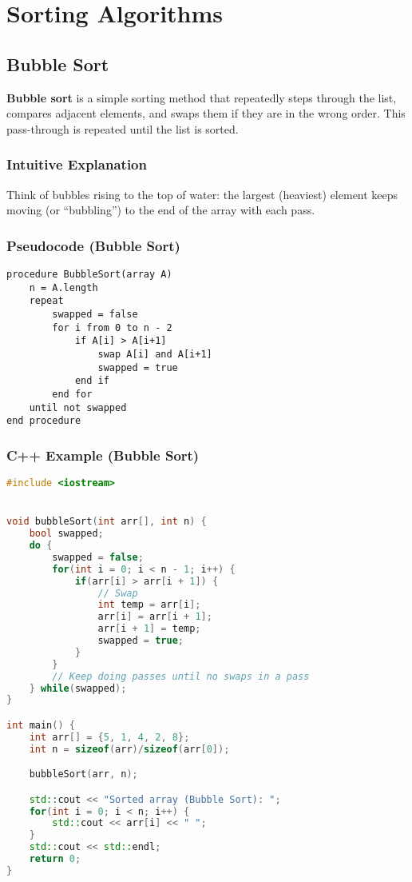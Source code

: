 \documentclass[a4paper,12pt]{article}
\begin{document}
\newpage
\section{Sorting Algorithms}
\subsection{Bubble Sort}
\textbf{Bubble sort} is a simple sorting method that repeatedly steps through the list, compares adjacent elements, and swaps them if they are in the wrong order. This pass-through is repeated until the list is sorted.

\subsubsection*{Intuitive Explanation}
Think of bubbles rising to the top of water: the largest (heaviest) element keeps moving (or ``bubbling'') to the end of the array with each pass.

\subsubsection*{Pseudocode (Bubble Sort)}
\begin{verbatim}
procedure BubbleSort(array A)
    n = A.length
    repeat
        swapped = false
        for i from 0 to n - 2
            if A[i] > A[i+1]
                swap A[i] and A[i+1]
                swapped = true
            end if
        end for
    until not swapped
end procedure
\end{verbatim}

\subsubsection*{C++ Example (Bubble Sort)}
\begin{lstlisting}[language=C++]
#include <iostream>


void bubbleSort(int arr[], int n) {
    bool swapped;
    do {
        swapped = false;
        for(int i = 0; i < n - 1; i++) {
            if(arr[i] > arr[i + 1]) {
                // Swap
                int temp = arr[i];
                arr[i] = arr[i + 1];
                arr[i + 1] = temp;
                swapped = true;
            }
        }
        // Keep doing passes until no swaps in a pass
    } while(swapped);
}

int main() {
    int arr[] = {5, 1, 4, 2, 8};
    int n = sizeof(arr)/sizeof(arr[0]);

    bubbleSort(arr, n);

    std::cout << "Sorted array (Bubble Sort): ";
    for(int i = 0; i < n; i++) {
        std::cout << arr[i] << " ";
    }
    std::cout << std::endl;
    return 0;
}
\end{lstlisting}
\end{document}
